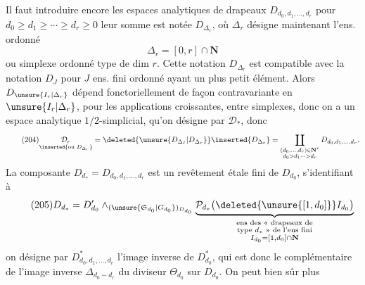 Il faut introduire encore les espaces analytiques
de drapeaux $D_{d_0,d_1,\ldots,d_r}$ pour $d_0\geq d_1\geq\cdots\geq d_r\geq0$
leur somme est notée $D_{\Delta_r}$, où $\Delta_r$ désigne
maintenant l'ens. ordonné
\[
\tag{203}\Delta_r=[0,r]\cap\mathbf N
\]
ou simplexe ordonné type de dim $r$. Cette notation
$D_{\Delta_r}$ est compatible avec la notation $D_J$ pour $J$
ens. fini ordonné ayant un plus petit élément.
Alors $D_{\unsure{I_r|\Delta_r}}$ dépend fonctoriellement de façon
contravariante en $\unsure{I_r|\Delta_r}$, pour les applications
croissantes, entre simplexes, donc on a un
espace analytique $1/2$-simplicial, qu'on désigne par
$\mathcal D_*$, donc
\[
\tag{204}
\underset{\inserted{\text{ou }D_{\Delta_r}}}{\mathcal D_r}
=\deleted{\unsure{D_{\Delta_I}|D_{\Delta_r}}}\inserted{D_{\Delta_r}}
=\coprod_{\substack{(d_0,\ldots,d_r)\in\mathbf N^r\\d_0>d_1\cdots>d_r}}
D_{d_0,d_1,\ldots,d_r}.
\]
La composante $D_{d_*}=D_{d_0,d_1,\ldots,d_r}$ est
un revêtement étale fini de $D_{d_0}$, s'identifiant
à
\[
\tag{205}
D_{d_*}=D'_{d_0}\wedge_{(\unsure{\mathfrak S_{d_0}|G_{d_0}})_{D_{d_0}}}
\underbrace{\mathcal P_{d_*}\bigl(\deleted{\unsure{[1,d_0]}}I_{d_0}\bigr)}_{
\substack{\text{ens des « drapeaux de}\\
\text{type }d_*\text{ » de l'ens fini}\\I_{d_0}=[1,d_0]\cap\mathbf N}}
\]
on désigne par $D^*_{d_0,d_1,\ldots,d_r}$ l'image inverse
de $D^*_{d_0}$, qui est donc le complémentaire
de l'image inverse $\Delta_{d_0- d_r}$ du diviseur
$\Theta_{d_0}$ sur $D_{d_0}$. On peut bien sûr plus 
